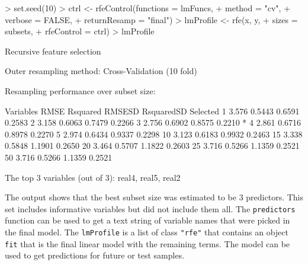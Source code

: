 \documentclass[12pt]{article}
\begin{document}
\begin{Schunk}
\begin{Sinput}
> set.seed(10)
> ctrl <- rfeControl(functions = lmFuncs,
+                    method = "cv",
+                    verbose = FALSE,
+                    returnResamp = "final")
> lmProfile <- rfe(x, y,
+                  sizes = subsets,
+                  rfeControl = ctrl)
> lmProfile
\end{Sinput}
\begin{Soutput}
Recursive feature selection

Outer resampling method: Cross-Validation (10 fold) 

Resampling performance over subset size:

 Variables  RMSE Rsquared RMSESD RsquaredSD Selected
         1 3.576   0.5443 0.6591     0.2583         
         2 3.158   0.6063 0.7479     0.2266         
         3 2.756   0.6902 0.8575     0.2210        *
         4 2.861   0.6716 0.8978     0.2270         
         5 2.974   0.6434 0.9337     0.2298         
        10 3.123   0.6183 0.9932     0.2463         
        15 3.338   0.5848 1.1901     0.2650         
        20 3.464   0.5707 1.1822     0.2603         
        25 3.716   0.5266 1.1359     0.2521         
        50 3.716   0.5266 1.1359     0.2521         

The top 3 variables (out of 3):
   real4, real5, real2
\end{Soutput}
\end{Schunk}
The output shows that the  best subset size was estimated to be 3 predictors. This set includes informative variables but did not include them all. The \texttt{predictors} function can be used to get a text string of variable names that were picked in the final model. The \texttt{lmProfile} is a list of class \texttt{"rfe"} that contains an object \texttt{fit} that is the final linear model with the remaining terms. The model can be used to get predictions for future or test samples. 
\end{document}

